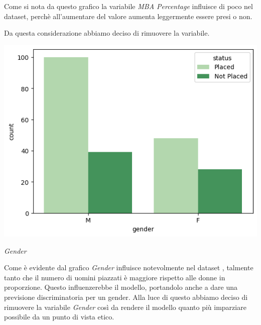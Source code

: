 \documentclass[12pt]{article}
\begin{document}
Come si nota da questo grafico la variabile \textit{MBA Percentage} influisce di poco nel dataset, perchè all'aumentare del valore aumenta leggermente essere presi o non.

Da questa considerazione abbiamo deciso di rimuovere la variabile.

\begin{center}
    \includegraphics[scale=0.5]{gender.png}

    \textit{Gender}
\end{center}

Come è evidente dal grafico \textit{Gender} influisce notevolmente nel dataset , talmente tanto che il numero di uomini piazzati è maggiore rispetto alle donne in proporzione. Questo influenzerebbe il modello, portandolo anche a dare una previsione discriminatoria per un gender. 
Alla luce di questo abbiamo deciso di rimuovere la variabile \textit{Gender} così da rendere il modello quanto più imparziare possibile da un punto di vista etico. 
\end{document}
